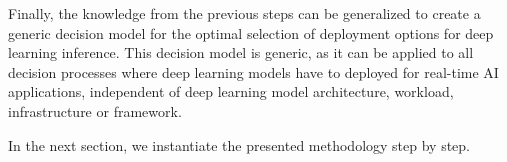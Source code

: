 Finally, the knowledge from the previous steps can be generalized to create a generic decision model for the optimal selection of deployment options for deep learning inference.
This decision model is generic, as it can be applied to all decision processes where deep learning models have to deployed for real-time AI applications, independent of deep learning model architecture, workload, infrastructure or framework.



\vspace{0.5cm}
In the next section, we instantiate the presented methodology step by step.










\endinput 